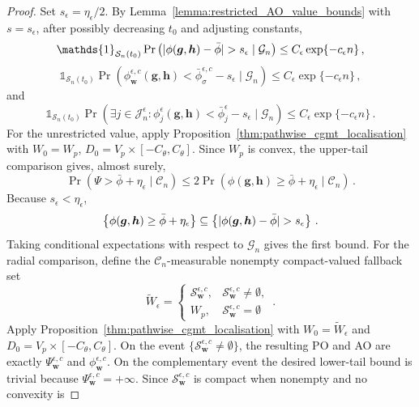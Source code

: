 \documentclass{article}
\makeatletter
\theoremstyle{definition}
\newcommand{\abs}[1]{%
	\ensuremath{%
		\if@display
		\left| #1 \right|
		\else
		\lvert #1 \rvert
		\fi
	}%
}
\newcommand*{\bb}{\boldsymbol}
\def\bw {\bb{w}}
\def\bh{\bb{h}}
\def\bg{\bb{g}}
\makeatother
\begin{document}
\begin{bibunit}
\begin{proof}
Set $s_\epsilon=\eta_\epsilon/2$. By
Lemma~\ref{lemma:restricted_AO_value_bounds} with $s=s_\epsilon$, after
possibly decreasing $t_0$ and adjusting constants,
$$
    \mathds{1}_{\mathcal S_n(t_0)}
    \Pr\left(
        \abs{\phi(\bg,\bh)-\bar\phi}>s_\epsilon
        \mid
        \mathcal G_n
    \right)
    \leq
    C_\epsilon\exp\{-c_\epsilon n\}\,,
$$
$$
    \mathds{1}_{\mathcal S_n(t_0)}
    \Pr\left(
        \phi_{\bw}^{\epsilon,c}(\bg,\bh)
        <
        \bar\phi_{\sigma}^{\epsilon,c}-s_\epsilon
        \mid
        \mathcal G_n
    \right)
    \leq
    C_\epsilon\exp\{-c_\epsilon n\}\,,
$$
and
$$
    \mathds{1}_{\mathcal S_n(t_0)}
    \Pr\left(
        \exists j\in\mathcal J_n^\epsilon:
        \phi_j^\epsilon(\bg,\bh)
        <
        \bar\phi_j^\epsilon-s_\epsilon
        \mid
        \mathcal G_n
    \right)
    \leq
    C_\epsilon\exp\{-c_\epsilon n\} \,.
$$
For the unrestricted value, apply
Proposition~\ref{thm:pathwise_cgmt_localisation} with
$
    W_0=W_p$, $
    D_0=V_p\times[-C_\theta,C_\theta]
$. 
Since $W_p$ is convex, the upper-tail comparison gives, almost surely,
$$
    \Pr\left(
        \Psi>\bar\phi+\eta_\epsilon
        \mid
        \mathcal C_n
    \right)
    \leq
    2
    \Pr\left(
        \phi(\bg,\bh)\geq\bar\phi+\eta_\epsilon
        \mid
        \mathcal C_n
    \right) \,.
$$
Because $s_\epsilon<\eta_\epsilon$,
$$
    \left\{
        \phi(\bg,\bh)\geq\bar\phi+\eta_\epsilon
    \right\}
    \subseteq
    \left\{
        \abs{\phi(\bg,\bh)-\bar\phi}>s_\epsilon
    \right\} \,.
$$
Taking conditional expectations with respect to $\mathcal G_n$ gives the
first bound.
For the radial comparison, define the $\mathcal C_n$-measurable
nonempty compact-valued fallback set 
$$
    \widetilde W_\epsilon
    =
    \begin{cases}
        \mathcal S_{\bw}^{\epsilon,c},
        & \mathcal S_{\bw}^{\epsilon,c}\neq\emptyset,\\
        W_p,
        & \mathcal S_{\bw}^{\epsilon,c}=\emptyset
    \end{cases}\,.
$$
Apply Proposition~\ref{thm:pathwise_cgmt_localisation} with
$W_0=\widetilde W_\epsilon$ and
$D_0=V_p\times[-C_\theta,C_\theta]$. On the event
$\{\mathcal S_{\bw}^{\epsilon,c}\neq\emptyset\}$, the resulting PO and
AO are exactly $\Psi_{\bw}^{\epsilon,c}$ and
$\phi_{\bw}^{\epsilon,c}$. On the complementary event the desired lower-tail
bound is trivial because $\Psi_{\bw}^{\epsilon,c}=+\infty$. Since
$\mathcal S_{\bw}^{\epsilon,c}$ is compact when nonempty and no convexity is

\end{proof}
\end{bibunit}
\end{document}
